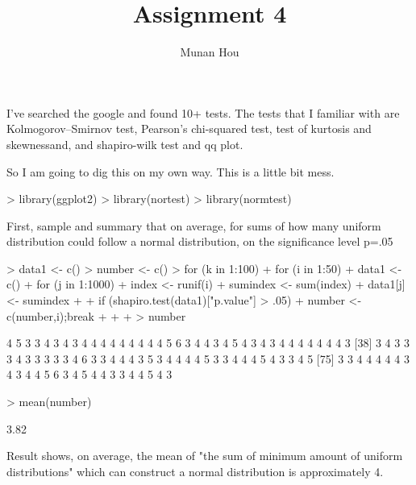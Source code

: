 \documentclass[a4paper]{article}
\title{Assignment 4}
\author{Munan Hou}
\begin{document}


I've searched the google and found 10+ tests. The tests that I familiar with are Kolmogorov–Smirnov test, Pearson's chi-squared test, test of kurtosis and skewnessand, and shapiro-wilk test and qq plot.

So I am going to dig this on my own way. This is a little bit mess.

\begin{Schunk}
\begin{Sinput}
> library(ggplot2)
> library(nortest)
> library(normtest)
\end{Sinput}
\end{Schunk}




First, sample and summary that on average, for sums of how many uniform distribution could follow a normal distribution, on the significance level p=.05
\begin{Schunk}
\begin{Sinput}
> data1 <- c()
> number <- c()
> for (k in 1:100) {
+   for (i in 1:50) {
+     data1 <- c()
+     for (j in 1:1000) {
+       index <- runif(i)
+       sumindex <- sum(index)
+       data1[j] <- sumindex
+     }
+     if (shapiro.test(data1)["p.value"] > .05) {
+       number <- c(number,i);break
+     }
+   }
+ }
> number
\end{Sinput}
\begin{Soutput}
  [1] 4 5 3 3 4 3 4 3 4 4 4 4 4 4 4 4 4 5 6 3 4 4 3 4 5 4 3 4 3 4 4 4 4 4 4 4 3
 [38] 3 4 3 3 3 4 3 3 3 3 3 4 6 3 3 4 4 4 3 5 3 4 4 4 4 5 3 3 4 4 4 5 4 3 3 4 5
 [75] 3 3 4 4 4 4 4 3 4 3 4 4 5 6 3 4 5 4 4 3 3 4 4 5 4 3
\end{Soutput}
\begin{Sinput}
> mean(number)
\end{Sinput}
\begin{Soutput}
[1] 3.82
\end{Soutput}
\end{Schunk}
Result shows, on average, the mean of "the sum of minimum amount of uniform distributions" which can construct a normal distribution is approximately 4.
\end{document}

